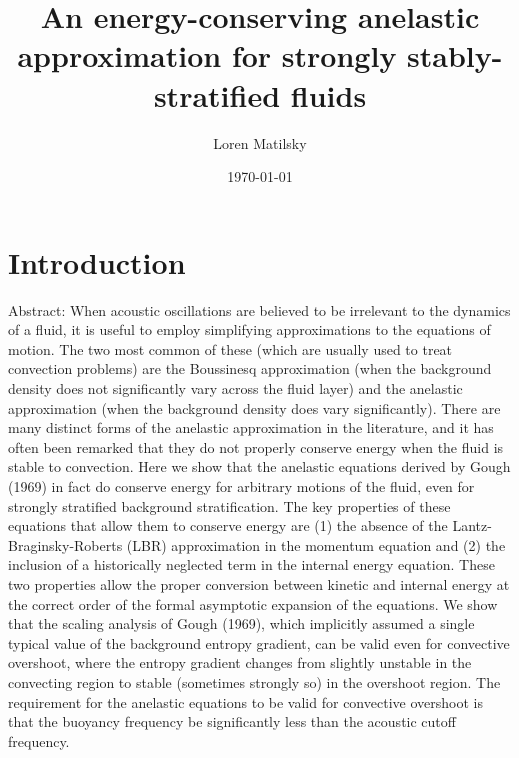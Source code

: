 \documentclass[12pt]{article}
\date{\today}
\author{Loren Matilsky}
\title{An energy-conserving anelastic approximation for strongly stably-stratified fluids}
\begin{document}
	\maketitle
	\section{Introduction}\label{sec:intro}
	Abstract: When acoustic oscillations are believed to be irrelevant to the dynamics of a fluid, it is useful to employ simplifying approximations to the equations of motion. The two most common of these (which are usually used to treat convection problems) are the Boussinesq approximation (when the background density does not significantly vary across the fluid layer) and the anelastic approximation (when the background density does vary significantly). There are many distinct forms of the anelastic approximation in the literature, and it has often been remarked that they do not properly conserve energy when the fluid is stable to convection. Here we show that the anelastic equations derived by Gough (1969) in fact do conserve energy for arbitrary motions of the fluid, even for strongly stratified background stratification. The key properties of these equations that allow them to conserve energy are (1) the absence of the Lantz-Braginsky-Roberts (LBR) approximation in the momentum equation and (2) the inclusion of a historically neglected term in the internal energy equation. These two properties allow the proper conversion between kinetic and internal energy at the correct order of the formal asymptotic expansion of the equations. We show that the scaling analysis of Gough (1969), which implicitly assumed a single typical value of the background entropy gradient, can be valid even for convective overshoot, where the entropy gradient changes from slightly unstable in the convecting region to stable (sometimes strongly so) in the overshoot region. The requirement for the anelastic equations to be valid for convective overshoot is that the buoyancy frequency be significantly less than the acoustic cutoff frequency. 
	\\
	
\end{document}
